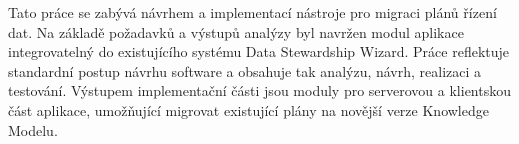 Tato práce se zabývá návrhem a implementací nástroje pro migraci plánů řízení dat.
Na základě požadavků a výstupů analýzy byl navržen modul aplikace integrovatelný do existujícího systému Data Stewardship Wizard.
Práce reflektuje standardní postup návrhu software a obsahuje tak analýzu, návrh, realizaci a testování.
Výstupem implementační části jsou moduly pro serverovou a klientskou část aplikace, umožňující migrovat existující plány na novější verze Knowledge Modelu.
